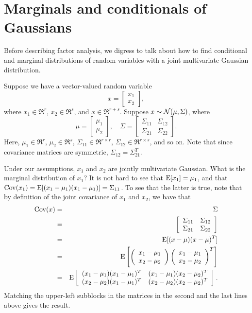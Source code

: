 \documentclass{article}
\begin{document}
\section{Marginals and conditionals of Gaussians}

Before describing factor analysis, we digress to talk about how to find conditional
and marginal distributions of random variables with a joint multivariate Gaussian distribution.

Suppose we have a vector-valued random variable
\[
x = \left[\begin{array}{c} x_1 \\ x_2 \end{array} \right],
\]
where $x_1 \in \Re^r$, $x_2 \in \Re^s$, and $x \in \Re^{r+s}$.  Suppose
$x \sim {\cal N}(\mu, \Sigma)$, where
\[
\mu = \left[\begin{array}{c} \mu_1 \\ \mu_2 \end{array} \right],
\quad
\Sigma = \left[\begin{array}{cc} \Sigma_{11} & \Sigma_{12} \\ \Sigma_{21} & \Sigma_{22} \end{array} \right].
\]
Here, $\mu_1 \in \Re^r$, $\mu_2 \in \Re^s$, $\Sigma_{11} \in \Re^{r\times r}$,
$\Sigma_{12} \in \Re^{r\times s}$, and so on.  Note that since covariance matrices
are symmetric, $\Sigma_{12} = \Sigma_{21}^T$.

Under our assumptions, $x_1$ and $x_2$ are jointly multivariate Gaussian.  What is the
marginal distribution of $x_1$?  It is not hard to see that ${\rm E}[x_1] = \mu_1$, and
that ${\rm Cov}(x_1) = {\rm E}[(x_1-\mu_1)(x_1-\mu_1)] = \Sigma_{11}$.  To see that the latter
is true, note that by definition of the joint covariance of $x_1$ and $x_2$, we have
that
\begin{eqnarray*}
{\rm Cov}(x) &=& \Sigma \\
&=& \left[\begin{array}{cc} \Sigma_{11} & \Sigma_{12} \\ \Sigma_{21} & \Sigma_{22} \end{array} \right] \\
&=& {\rm E}[(x-\mu)(x-\mu)^T] \\
&=& {\rm E}\left[
\left(\begin{array}{c} x_1 - \mu_1 \\ x_2 - \mu_2 \end{array} \right)
\left(\begin{array}{c} x_1 - \mu_1 \\ x_2 - \mu_2 \end{array} \right)^T \right] \\
&=& {\rm E}\left[
\begin{array}{cc}
(x_1 - \mu_1)(x_1-\mu_1)^T & (x_1 - \mu_1)(x_2-\mu_2)^T \\
(x_2 - \mu_2)(x_1-\mu_1)^T & (x_2 - \mu_2)(x_2-\mu_2)^T
\end{array}
\right].
\end{eqnarray*}
Matching the upper-left subblocks in the matrices in the second and the last lines above
gives the result.
\end{document}
